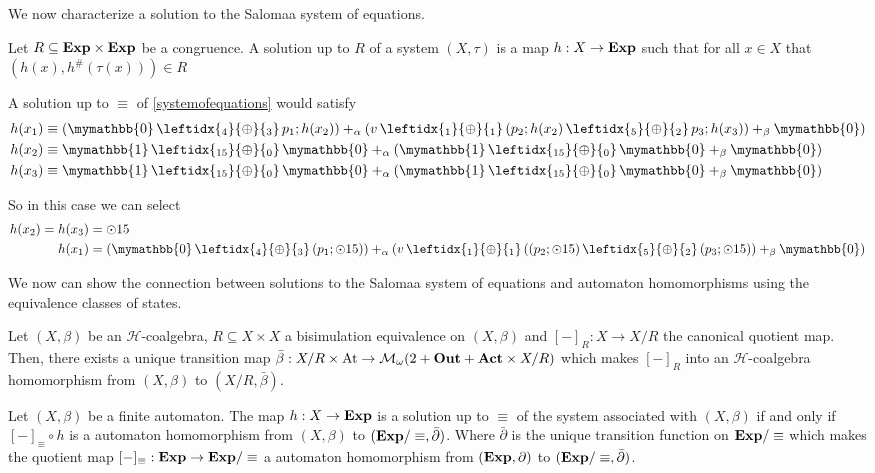 \documentclass[a4paper,UKenglish,cleveref, autoref, thm-restate]{lipics-v2021}
\newcommand{\Out}{\textbf{\upshape{Out}}}
\newcommand{\Act}{\textbf{\upshape{Act}}}
\newcommand{\At}{\text{\upshape{At}}}
\newcommand{\Exp}{\textbf{\upshape{Exp}}}
\newcommand{\WC}[2]{\,\leftidx{_{#1}}{{\oplus}}{_{#2}}\,}
\newcommand{\Mon}{\mathcal{M}_\omega}
\newcommand{\bskip}{\mymathbb{1}}
\newcommand{\babort}{\mymathbb{0}}
\newcommand{\wgkat}{\textsf{\upshape{wGKAT}}\xspace}
\theoremstyle{plain}\newtheoremrep{thm}{Theorem}[section]
\begin{document}
	We now characterize a solution to the Salomaa system of equations. 
	\begin{defn}
		Let $R \subseteq \Exp \times \Exp$ be a congruence. A solution up to $R$ of a system $(X, \tau)$ is a map $h: X \to \Exp$ such that for all $x \in X$ that $(h(x), h^{\#}(\tau(x))) \in R$
	\end{defn}
	\begin{exmp}
		A solution up to $\equiv$ of \cref{systemofequations} would satisfy
		\begin{align*}
			h(x_1) &\equiv (\babort \WC{4}{3} p_1;h(x_2)) +_\alpha (v \WC{1}{1} (p_2;h(x_2)\WC{5}{2}p_3;h(x_3))+_\beta \babort) \\
			h(x_2) &\equiv \bskip \WC{15}{0} \babort +_\alpha (\bskip \WC{15}{0} \babort +_\beta \babort)\\
			h(x_3) &\equiv \bskip \WC{15}{0} \babort +_\alpha (\bskip \WC{15}{0} \babort +_\beta \babort)
		\end{align*}
		
		So in this case we can select 
		\begin{align*}
			h(x_2) = h(x_3) &= \odot 15\\
			h(x_1) &=  (\babort \WC{4}{3} (p_1;\odot 15)) +_\alpha (v \WC{1}{1} ((p_2;\odot 15)\WC{5}{2}(p_3;\odot 15))+_\beta \babort)
		\end{align*}
	\end{exmp}
	We now can show the connection between solutions to the Salomaa system of equations and automaton homomorphisms using the equivalence classes of states.
	\begin{toappendix}
		\begin{lem}\label{uniquemapbisim}
			Let $(X, \beta)$ be an $\mathcal H$-coalgebra, $R \subseteq X \times X$ a bisimulation equivalence on $(X, \beta)$ and $[-]_R:X \to X/R$ the canonical quotient map. Then, there exists a unique transition map $\bar\beta: X/R \times \At \to \Mon(2+\Out+\Act\times X/R)$ which makes $[-]_R$ into an $\mathcal{H}$-coalgebra homomorphism from $(X, \beta)$ to $(X/R, \bar\beta)$. \label{lem65}
		\end{lem}
	\end{toappendix}
	\begin{thmrep}
		Let $(X, \beta)$ be a finite \wgkat automaton. The map $h:X\to \Exp$ is a solution up to $\equiv$ of the system associated with $(X, \beta)$ if and only if $[-]_\equiv \circ h$ is a \wgkat automaton homomorphism from $(X, \beta)$ to $(\Exp/\equiv, \bar\partial)$. Where $\bar\partial$ is the unique transition function on $\Exp/\equiv$ which makes the quotient map $[-]_\equiv:\Exp \to \Exp/\equiv$ a \wgkat automaton homomorphism from $(\Exp, \partial)$ to $(\Exp/\equiv, \bar\partial)$.  \label{thm21}
	\end{thmrep}
\end{document}
